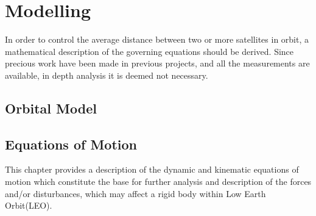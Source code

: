 \chapter{Modelling}
In order to control the average distance between two or more satellites in orbit, a mathematical description of the governing equations should be derived. Since precious work have been made in previous projects, and all the measurements are available, in depth analysis it is deemed not necessary.
%   
\section{Orbital Model}
%
\section{Equations of Motion}
%
This chapter provides a description of the dynamic and kinematic equations of motion which constitute the base for further analysis and description of the forces and/or disturbances, which may affect a rigid body within  Low Earth Orbit(LEO).
%
